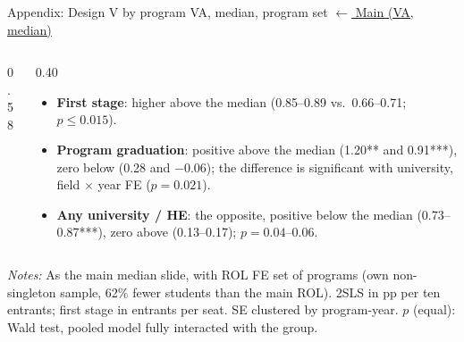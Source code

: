 \documentclass{beamer}
\begin{document}
\begin{frame}[label=d5-app-va-median-set]{Appendix: Design V by program VA, median, program set}
\vspace{-0.3cm}
\hyperlink{d5-va-median}{\tiny\color{blue}$\leftarrow$ Main (VA, median)}

\begin{columns}[T,onlytextwidth]
\begin{column}{0.58\textwidth}
\centering
\tiny
\resizebox{\linewidth}{!}{}
\end{column}
\begin{column}{0.40\textwidth}
\scriptsize
\begin{itemize}
    \setlength{\itemsep}{3pt}
    \item \textbf{First stage}: higher above the median (0.85--0.89 vs.\ 0.66--0.71; $p\leq0.015$).
    \item \textbf{Program graduation}: positive above the median (1.20** and 0.91***), zero below (0.28 and $-$0.06); the difference is significant with university, field $\times$ year FE ($p=0.021$).
    \item \textbf{Any university / HE}: the opposite, positive below the median (0.73--0.87***), zero above (0.13--0.17); $p=0.04$--0.06.
\end{itemize}
\end{column}
\end{columns}

\vspace{0.05cm}
\parbox{0.97\textwidth}{\tiny \textit{Notes:} As the main median slide, with ROL FE set of programs (own non-singleton sample, 62\% fewer students than the main ROL). 2SLS in pp per ten entrants; first stage in entrants per seat. SE clustered by program-year. $p$ (equal): Wald test, pooled model fully interacted with the group.}
\end{frame}
\end{document}
